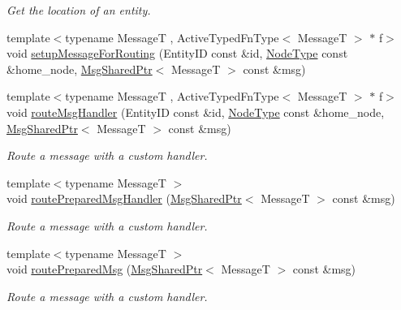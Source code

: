 \begin{DoxyCompactItemize}
\begin{DoxyCompactList}\small\item\em Get the location of an entity. \end{DoxyCompactList}\item 
{\footnotesize template$<$typename MessageT , Active\+Typed\+Fn\+Type$<$ Message\+T $>$ $\ast$ f$>$ }\\void \hyperlink{structvt_1_1location_1_1_entity_location_coord_ab0ac67afe38b64ec6c1df9119d49d587}{setup\+Message\+For\+Routing} (Entity\+ID const \&id, \hyperlink{namespacevt_a866da9d0efc19c0a1ce79e9e492f47e2}{Node\+Type} const \&home\+\_\+node, \hyperlink{namespacevt_ab2b3d506ec8e8d1540aede826d84a239}{Msg\+Shared\+Ptr}$<$ MessageT $>$ const \&msg)
\item 
{\footnotesize template$<$typename MessageT , Active\+Typed\+Fn\+Type$<$ Message\+T $>$ $\ast$ f$>$ }\\void \hyperlink{structvt_1_1location_1_1_entity_location_coord_acc6301c0db37a3deaa8f28cc7f7d52bd}{route\+Msg\+Handler} (Entity\+ID const \&id, \hyperlink{namespacevt_a866da9d0efc19c0a1ce79e9e492f47e2}{Node\+Type} const \&home\+\_\+node, \hyperlink{namespacevt_ab2b3d506ec8e8d1540aede826d84a239}{Msg\+Shared\+Ptr}$<$ MessageT $>$ const \&msg)
\begin{DoxyCompactList}\small\item\em Route a message with a custom handler. \end{DoxyCompactList}\item 
{\footnotesize template$<$typename MessageT $>$ }\\void \hyperlink{structvt_1_1location_1_1_entity_location_coord_a110012758ba721c4ecf2816764fc799e}{route\+Prepared\+Msg\+Handler} (\hyperlink{namespacevt_ab2b3d506ec8e8d1540aede826d84a239}{Msg\+Shared\+Ptr}$<$ MessageT $>$ const \&msg)
\begin{DoxyCompactList}\small\item\em Route a message with a custom handler. \end{DoxyCompactList}\item 
{\footnotesize template$<$typename MessageT $>$ }\\void \hyperlink{structvt_1_1location_1_1_entity_location_coord_a6f03e0def3dee2b0e75f7787e0a4c2e9}{route\+Prepared\+Msg} (\hyperlink{namespacevt_ab2b3d506ec8e8d1540aede826d84a239}{Msg\+Shared\+Ptr}$<$ MessageT $>$ const \&msg)
\begin{DoxyCompactList}\small\item\em Route a message with a custom handler. \end{DoxyCompactList}\item 

\end{DoxyCompactItemize}
